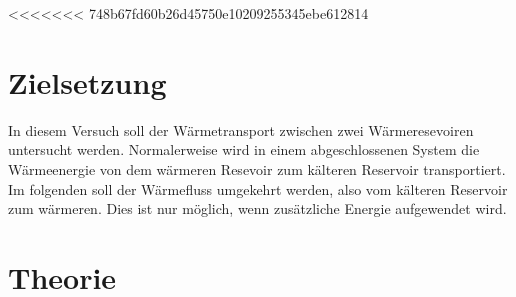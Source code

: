 <<<<<<< 748b67fd60b26d45750e10209255345ebe612814

\section{Zielsetzung}
In diesem Versuch soll der Wärmetransport zwischen zwei Wärmeresevoiren untersucht werden.
Normalerweise wird in einem abgeschlossenen System die Wärmeenergie von dem wärmeren Resevoir zum
kälteren Reservoir transportiert. Im folgenden soll der Wärmefluss umgekehrt werden, also vom
kälteren Reservoir zum wärmeren. Dies ist nur möglich, wenn zusätzliche Energie
aufgewendet wird.

\section{Theorie}
